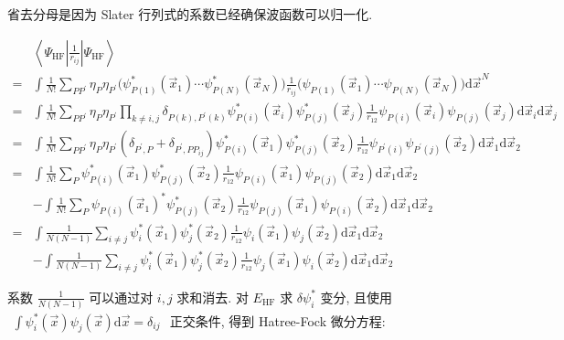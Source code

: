 \documentclass[../../main.tex]{subfiles}
\begin{document}
省去分母是因为 Slater 行列式的系数已经确保波函数可以归一化. 

\begin{align*}
  &\left\langle \Psi_{\text{HF}}\left|\frac{1}{r_{ij}}\right|\Psi_{\text{HF}}\right\rangle\\
=& \int\frac{1}{N!}\sum_{PP^{\prime}}\eta_{P}\eta_{P^{\prime}}\bigg(\psi_{P(1)}^{*}(\vec{x}_{1})\cdots\psi_{P(N)}^{*}(\vec{x}_{N})\bigg)\frac{1}{r_{ij}}\bigg(\psi_{P(1)}(\vec{x}_{1})\cdots\psi_{P(N)}(\vec{x}_{N})\bigg)\mathrm{d}\vec{x}^{N}\\
=& \int\frac{1}{N!}\sum_{PP^{\prime}}\eta_{P}\eta_{P^{\prime}}\prod_{k\neq i,j}\delta_{P(k),P^{\prime}(k)}\psi_{P(i)}^{*}(\vec{x}_{i})\psi_{P(j)}^{*}(\vec{x}_{j})\frac{1}{r_{12}}\psi_{P(i)}(\vec{x}_{i})\psi_{P(j)}(\vec{x}_{j})\mathrm{d}\vec{x}_{i}\mathrm{d}\vec{x}_{j}\\
=& \int\frac{1}{N!}\sum_{PP^{\prime}}\eta_{P}\eta_{P^{\prime}}\left(\delta_{P^{\prime},P} + \delta_{P^{\prime},PP_{ij}}\right)\psi_{P(i)}^{*}(\vec{x}_{1})\psi_{P(j)}^{*}(\vec{x}_{2})\frac{1}{r_{12}}\psi_{P^{\prime}(i)}\psi_{P^{\prime}(j)}(\vec{x}_{2})\mathrm{d}\vec{x}_{1}\mathrm{d}\vec{x}_{2}\\
=& \int\frac{1}{N!}\sum_{P}\psi_{P(i)}^{*}(\vec{x}_{1})\psi_{P(j)}^{*}(\vec{x}_{2})\frac{1}{r_{12}}\psi_{P(i)}(\vec{x}_{1})\psi_{P(j)}(\vec{x}_{2})\mathrm{d}\vec{x}_{1}\mathrm{d}\vec{x}_{2} \\
&- \int\frac{1}{N!}\sum_{P}\psi_{P(i)}(\vec{x}_{1})^{*}\psi_{P(j)}^{*}(\vec{x}_{2})\frac{1}{r_{12}}\psi_{P(j)}(\vec{x}_{1})\psi_{P(i)}(\vec{x}_{2})\mathrm{d}\vec{x}_{1}\mathrm{d}\vec{x}_{2}\\
=& \int\frac{1}{N(N-1)}\sum_{i\neq j}\psi_{i}^{*}(\vec{x}_{1})\psi_{j}^{*}(\vec{x}_{2})\frac{1}{r_{12}}\psi_{i}(\vec{x}_{1})\psi_{j}(\vec{x}_{2})\mathrm{d}\vec{x}_{1}\mathrm{d}\vec{x}_{2}\\
&- \int\frac{1}{N(N-1)}\sum_{i\neq j}\psi_{i}^{*}(\vec{x}_{1})\psi_{j}^{*}(\vec{x}_{2})\frac{1}{r_{12}}\psi_{j}(\vec{x}_{1})\psi_{i}(\vec{x}_{2})\mathrm{d}\vec{x}_{1}\mathrm{d}\vec{x}_{2}
\end{align*}

系数 $\frac{1}{N(N-1)}$ 可以通过对 $i,j$ 求和消去. 对 $E_{\text{HF}}$ 求 $\delta\psi_{i}^{*}$ 变分, 且使用 $\begin{aligned}
  \int\psi_{i}^{*}(\vec{x})\psi_{j}(\vec{x})\mathrm{d}\vec{x} = \delta_{ij}
\end{aligned}$ 正交条件, 得到 Hatree-Fock 微分方程:
\end{document}
